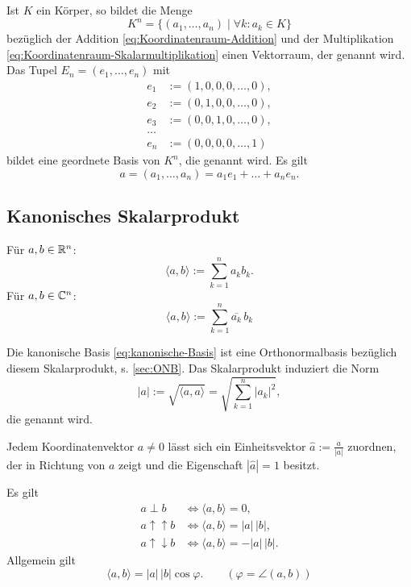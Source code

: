 Ist $K$ ein Körper, so bildet die Menge
\begin{equation}
K^n = \{(a_1,\ldots,a_n)\mid \forall k\colon a_k\in K\}
\end{equation}
bezüglich der Addition \eqref{eq:Koordinatenraum-Addition}
und der Multiplikation \eqref{eq:Koordinatenraum-Skalarmultiplikation}
einen Vektorraum, der  genannt wird.
Das Tupel $E_n=(e_1,\ldots,e_n)$ mit
\begin{equation}\label{eq:kanonische-Basis}
\begin{split}
e_1 &:= (1,0,0,0,\ldots, 0),\\
e_2 &:= (0,1,0,0,\ldots, 0),\\
e_3 &:= (0,0,1,0,\ldots, 0),\\
\ldots\\
e_n &:= (0,0,0,0,\ldots, 1)
\end{split}
\end{equation}
bildet eine geordnete Basis von $K^n$, die 
genannt wird. Es gilt
\begin{equation}
a = (a_1,\ldots,a_n) = a_1 e_1+\ldots+a_n e_n.
\end{equation}

\subsection{Kanonisches Skalarprodukt}
\begin{Definition}
Für $a,b\in\mathbb R^n$:
\begin{equation}
\langle a,b\rangle := \sum_{k=1}^n a_k b_k.
\end{equation}
Für $a,b\in\mathbb C^n$:
\begin{equation}
\langle a,b\rangle := \sum_{k=1}^n \overline{a_k}\,b_k
\end{equation}
\end{Definition}
\noindent
Die kanonische Basis \eqref{eq:kanonische-Basis} ist eine
Orthonormalbasis bezüglich diesem Skalarprodukt, s. \ref{sec:ONB}.
Das Skalarprodukt induziert die Norm
\begin{equation}
|a| := \sqrt{\langle a,a\rangle} = \sqrt{\textstyle \sum_{k=1}^n |a_k|^2},
\end{equation}
die  genannt wird.

Jedem Koordinatenvektor $a\ne 0$ lässt sich ein Einheitsvektor
$\hat a:=\frac{a}{|a|}$ zuordnen, der in Richtung von $a$ zeigt
und die Eigenschaft $|\hat a|=1$ besitzt.

Es gilt
\begin{align}
a\perp b &\iff \langle a,b\rangle=0,\\
a\uparrow\uparrow b &\iff \langle a,b\rangle = |a|\,|b|,\\
a\uparrow\downarrow b &\iff \langle a,b\rangle = -|a|\,|b|.
\end{align}
Allgemein gilt
\begin{equation}
\langle a,b\rangle = |a|\,|b|\cos\varphi.\qquad(\varphi=\angle (a,b))
\end{equation}

